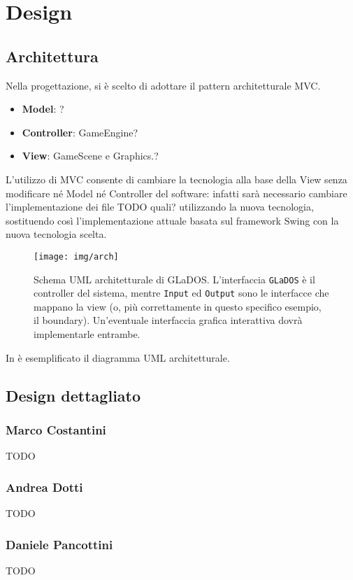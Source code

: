 \documentclass[a4paper,12pt]{report}
\begin{document}
\chapter{Design}
\section{Architettura}
Nella progettazione, si è scelto di adottare il pattern architetturale MVC.
\begin{itemize}
	\item \textbf{Model}: ?
	\item \textbf{Controller}:
	 GameEngine?
	\item \textbf{View}:
	GameScene e Graphics.?
\end{itemize}

L'utilizzo di MVC consente di cambiare la tecnologia alla base della View senza modificare né Model né Controller del software: infatti sarà necessario cambiare l'implementazione dei file {TODO quali?} utilizzando la nuova tecnologia, sostituendo così l'implementazione attuale basata sul framework Swing con la nuova tecnologia scelta.


\begin{figure}[h]
\centering{}
\texttt{[image: img/arch]}
\caption{Schema UML architetturale di GLaDOS. L'interfaccia \texttt{GLaDOS} è il controller del sistema, mentre \texttt{Input} ed \texttt{Output} sono le interfacce che mappano la view (o, più correttamente in questo specifico esempio, il boundary). Un'eventuale interfaccia grafica interattiva dovrà implementarle entrambe.}
\label{img:goodarch}
\end{figure}


In  è esemplificato il diagramma UML architetturale.


\section{Design dettagliato}

\subsection*{Marco Costantini}
{TODO}

\subsection*{Andrea Dotti}
{TODO}
\subsection*{Daniele Pancottini}
{TODO}
\end{document}
